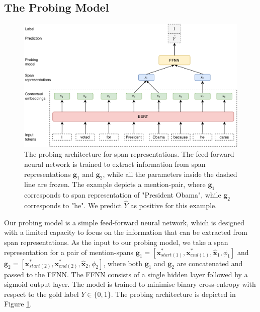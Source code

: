 \documentclass[11pt]{article}
\begin{document}
\subsection{The Probing Model}
\begin{figure}[ht]
  \includegraphics[width=\textwidth]{probing_model}
  \caption{The probing architecture for span representations. The feed-forward neural network is trained to extract information from span representations $\pmb{g}_{1}$ and $\pmb{g}_{2}$, while all the parameters inside the dashed line are frozen. The example depicts a mention-pair, where $\pmb{g}_{1}$ corresponds to span representation of "President Obama", while $\pmb{g}_{2}$ corresponds to "he". We predict $\hat{Y}$ as positive for this example.}
  \label{fig:probing_model}
\end{figure}

Our probing model is a simple feed-forward neural network, which is designed with a limited capacity to focus on the information that can be extracted from span representations.
As the input to our probing model, we take a span representation for a pair of mention-spans $\pmb{g}_{1} = [\pmb{x}_{start(1)}^{*}, \pmb{x}_{end(1)}^{*}, \hat{\pmb{x}}_{1}, \phi_{1}]$ and $\pmb{g}_{2} = [\pmb{x}_{start(2)}^{*}, \pmb{x}_{end(2)}^{*}, \hat{\pmb{x}}_{2}, \phi_{2}]$, where both $\pmb{g}_{1}$ and $\pmb{g}_{2}$ are concatenated and passed to the FFNN. The FFNN consists of a single hidden layer followed by a sigmoid output layer. The model is trained to minimise binary cross-entropy with respect to the gold label $Y \in \{0,1\}$. The probing architecture is depicted in Figure \ref{fig:probing_model}.
\end{document}
